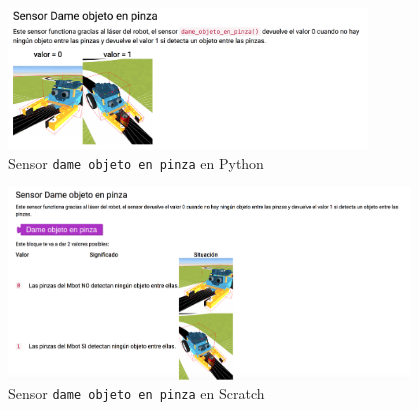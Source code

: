\begin{figure}[H]
    \centering
    \includegraphics[width=0.85\textwidth, height=0.45\textwidth]{chapters/images/teoriag5python.png}
    \caption{Sensor \texttt{dame objeto en pinza} en Python}
    \label{fig:my_label}
\end{figure}
\begin{figure}[H]
    \centering
    \includegraphics[width=0.95\textwidth, height=0.45\textwidth]{chapters/images/teoriag5scratch.png}
    \caption{Sensor \texttt{dame objeto en pinza} en Scratch}
    \label{fig:my_label}
\end{figure}

